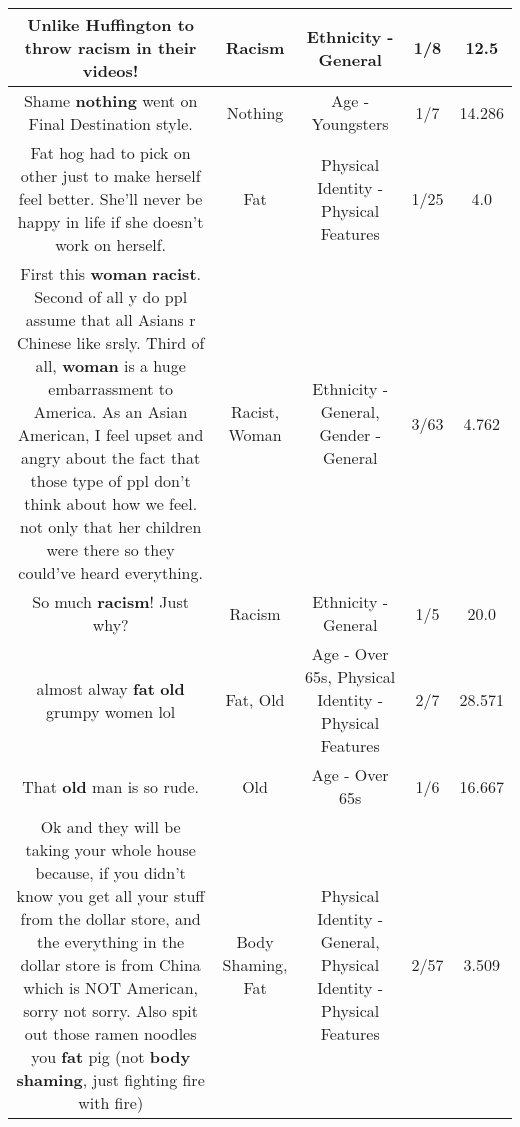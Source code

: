 \documentclass[11pt]{article}
\newlength\mylength
\begin{document}
\begin{center}
\begin{longtable}{|C{.65\mylength}|C{.30\mylength}|C{.12\mylength}|C{.12\mylength}|C{.12\mylength}|}
  \small Unlike Huffington to throw \textbf{racism} in their videos!\normalsize   & Racism & Ethnicity - General & 1/8 & 12.5 \\  \hline
  \small Shame \textbf{nothing} went on Final Destination style.\normalsize   & Nothing & Age - Youngsters & 1/7 & 14.286 \\  \hline
  \small Fat hog had to pick on other just to make herself feel better. She'll never be happy in life if she doesn't work on herself.\normalsize   & Fat & Physical Identity - Physical Features & 1/25 & 4.0 \\  \hline
  \small First this \textbf{woman} \textbf{racist}. Second of all y do ppl assume that all Asians r Chinese like srsly. Third of all, \textbf{woman} is a huge embarrassment to America. As an Asian American, I feel upset and angry about the fact that those type of ppl don't think about how we feel. not only that her children were there so they could've heard everything.\normalsize   & Racist, Woman & Ethnicity - General, Gender - General & 3/63 & 4.762 \\  \hline
  \small So much \textbf{racism}! Just why?\normalsize   & Racism & Ethnicity - General & 1/5 & 20.0 \\  \hline
  \small almost alway \textbf{fat} \textbf{old} grumpy women lol\normalsize   & Fat, Old & Age - Over 65s, Physical Identity - Physical Features & 2/7 & 28.571 \\  \hline
  \small That \textbf{old} man is so rude.\normalsize   & Old & Age - Over 65s & 1/6 & 16.667 \\  \hline
  \small Ok and they will be taking your whole house because, if you didn't know you get all your stuff from the dollar store, and the everything in the dollar store is from China which is NOT American, sorry not sorry. Also spit out those ramen noodles you \textbf{fat} pig (not \textbf{body shaming}, just fighting fire with fire)\normalsize   & Body Shaming, Fat & Physical Identity - General, Physical Identity - Physical Features & 2/57 & 3.509 \\  \hline

\end{longtable}
\end{center}
\end{document}
